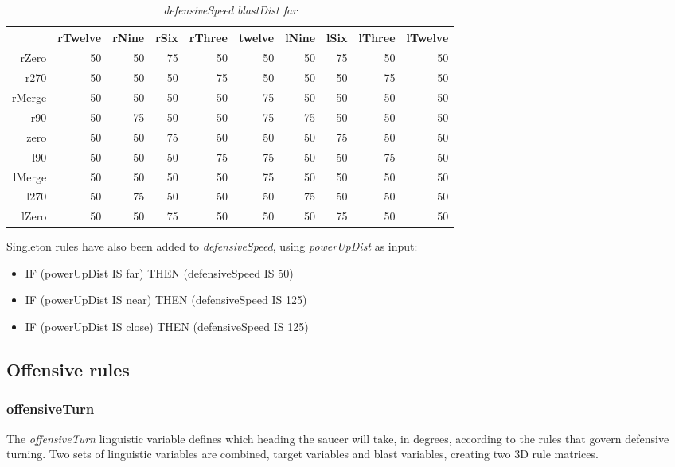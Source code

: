 \begin{table}[H]
\centering
\caption{\emph{defensiveSpeed} \emph{blastDist far}}
\label{Turn rule table}
\begin{tabular}{r|r|r|r|r|r|r|r|r|r}
 		& rTwelve 	& rNine 	& rSix 		& rThree 		& twelve 	& lNine 	& lSix 		& lThree	& lTwelve		\\ \hline
rZero	& 50		& 50		& 75		& 50 		 	& 50		& 50		& 75 		& 50		& 50			\\
r270	& 50		& 50		& 50		& 75			& 50		& 50		& 50		& 75		& 50			\\
rMerge	& 50		& 50		& 50	 	& 50			& 75		& 50		& 50		& 50		& 50			\\
r90		& 50		& 75		& 50 		& 50			& 75		& 75		& 50		& 50		& 50			\\
zero 	& 50		& 50 		& 75 		& 50			& 50		& 50		& 75		& 50		& 50			\\
l90 	& 50		& 50 		& 50		& 75			& 75		& 50		& 50		& 75		& 50			\\
lMerge	& 50		& 50 		& 50	 	& 50			& 75		& 50		& 50		& 50		& 50			\\
l270 	& 50		& 75	 	& 50 		& 50			& 50		& 75		& 50		& 50		& 50			\\
lZero 	& 50		& 50 		& 75	 	& 50			& 50		& 50  		& 75		& 50		& 50			
\end{tabular}
\end{table}

\noindent
Singleton rules have also been added to \emph{defensiveSpeed}, using \emph{powerUpDist} as input:

\begin{itemize}
\item IF (powerUpDist IS far) THEN (defensiveSpeed IS 50)
\item IF (powerUpDist IS near) THEN (defensiveSpeed IS 125)
\item IF (powerUpDist IS close) THEN (defensiveSpeed IS 125)
\end{itemize}

\subsection{Offensive rules}

\subsubsection{offensiveTurn}

The \emph{offensiveTurn} linguistic variable defines which heading the saucer will take, in degrees, according to the rules that govern defensive turning. Two sets of linguistic variables are combined, target variables and blast variables, creating two 3D rule matrices. 

